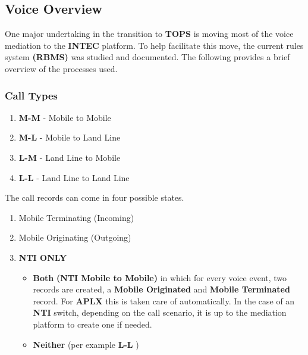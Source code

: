 \documentclass[12pt,twoside]{article}
\begin{document}
\subsection{Voice Overview}
\label{sec:orgheadline28}
One major undertaking in the transition to \textbf{TOPS} is moving most of the voice mediation to the \textbf{INTEC} platform. To help facilitate this move, the current rules system \textbf{(RBMS)} was studied and documented. The following provides a brief overview of the processes used.
\subsubsection{Call Types}
\label{sec:orgheadline25}
\begin{enumerate}
\item \textbf{M-M} - Mobile to Mobile
\item \textbf{M-L} - Mobile to Land Line
\item \textbf{L-M} - Land Line to Mobile
\item \textbf{L-L} - Land Line to Land Line
\end{enumerate}
The call records can come in four possible states.
\begin{enumerate}
\item Mobile Terminating (Incoming)
\item Mobile Originating (Outgoing)
\item \textbf{NTI ONLY}
\begin{itemize}
\item \textbf{Both}  \newline \textbf{(NTI Mobile to Mobile)} in which for every voice event, two records are created, a \textbf{Mobile Originated} and \textbf{Mobile Terminated} record. For \textbf{APLX} this is taken care of automatically. In the case of an \textbf{NTI} switch, depending on the call scenario, it is up to the mediation platform to create one if needed.
\item \textbf{Neither} \newline (per example \textbf{L-L} )
\end{itemize}
\end{enumerate}
\end{document}
